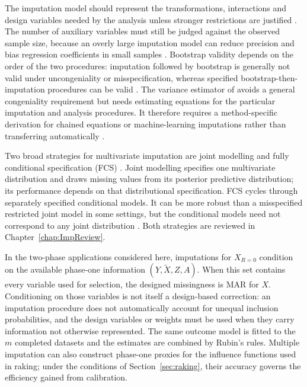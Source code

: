 The imputation model should represent the transformations, interactions and design variables needed by the analysis unless stronger restrictions are justified \citep{meng1994multiple}. The number of auxiliary variables must still be judged against the observed sample size, because an overly large imputation model can reduce precision and bias regression coefficients in small samples \citep{hardt2012auxiliary}. Bootstrap validity depends on the order of the two procedures: imputation followed by bootstrap is generally not valid under uncongeniality or misspecification, whereas specified bootstrap-then-imputation procedures can be valid \citep{bartlett2020bootstrap}. The variance estimator of \citet{robins2000inference} avoids a general congeniality requirement but needs estimating equations for the particular imputation and analysis procedures. It therefore requires a method-specific derivation for chained equations or machine-learning imputations rather than transferring automatically \citep{hughes2016comparison}.

Two broad strategies for multivariate imputation are joint modelling \citep{carpenter2023multiple} and fully conditional specification (FCS) \citep{vanBuuren2006}. Joint modelling specifies one multivariate distribution and draws missing values from its posterior predictive distribution; its performance depends on that distributional specification. FCS cycles through separately specified conditional models. It can be more robust than a misspecified restricted joint model in some settings, but the conditional models need not correspond to any joint distribution \citep{seaman2018relative, white2011multiple}. Both strategies are reviewed in Chapter~\ref{chap:ImpReview}.

In the two-phase applications considered here, imputations for $X_{R=0}$ condition on the available phase-one information $(Y, \tilde{X}, Z, A)$. When this set contains every variable used for selection, the designed missingness is MAR for $X$. Conditioning on those variables is not itself a design-based correction: an imputation procedure does not automatically account for unequal inclusion probabilities, and the design variables or weights must be used when they carry information not otherwise represented. The same outcome model is fitted to the $m$ completed datasets and the estimates are combined by Rubin's rules. Multiple imputation can also construct phase-one proxies for the influence functions used in raking; under the conditions of Section~\ref{sec:raking}, their accuracy governs the efficiency gained from calibration.


